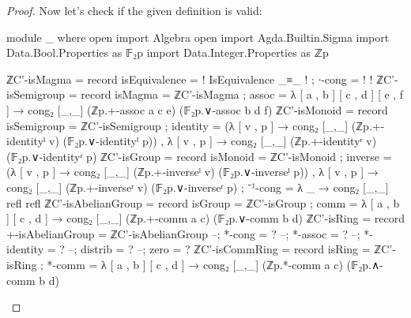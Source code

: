 \documentclass[a4paper]{report}
\theoremstyle{definition}
\begin{document}
\begin{proof}
  Now let's check if the given definition is valid:
  \begin{code}
module _ where
  open import Algebra
  open import Agda.Builtin.Sigma
  import Data.Bool.Properties as 𝔽₂p
  import Data.Integer.Properties as ℤp

  ℤC'-isMagma = record
    { isEquivalence = {! IsEquivalence _≡_ !}
    ; ∙-cong        = {!   !}
    }
  ℤC'-isSemigroup = record
    { isMagma = ℤC'-isMagma
      ; assoc   = λ [ a , b ] [ c , d ] [ e , f ] → cong₂ [_,_] (ℤp.+-assoc a c e) (𝔽₂p.∨-assoc b d f)
    }
  ℤC'-isMonoid = record
    { isSemigroup = ℤC'-isSemigroup
    ; identity    = (λ [ v , p ] → cong₂ [_,_] (ℤp.+-identityˡ v) (𝔽₂p.∨-identityˡ p)) , λ [ v , p ] → cong₂ [_,_] (ℤp.+-identityʳ v) (𝔽₂p.∨-identityʳ p)
    }
  ℤC'-isGroup = record
    { isMonoid = ℤC'-isMonoid
    ; inverse  = (λ [ v , p ] → cong₂ [_,_] (ℤp.+-inverseˡ v) (𝔽₂p.∨-inverseˡ p)) , λ [ v , p ] → cong₂ [_,_] (ℤp.+-inverseʳ v) (𝔽₂p.∨-inverseʳ p)
    ; ⁻¹-cong  = λ _ → cong₂ [_,_] refl refl
    }
  ℤC'-isAbelianGroup = record
    { isGroup = ℤC'-isGroup
    ; comm    = λ [ a , b ] [ c , d ] → cong₂ [_,_] (ℤp.+-comm a c) (𝔽₂p.∨-comm b d)
    }
  ℤC'-isRing = record
    { +-isAbelianGroup = ℤC'-isAbelianGroup
    --; *-cong = ?
    --; *-assoc = ?
    --; *-identity = ?
    --; distrib = ?
    --; zero = ?
    }
  ℤC'-isCommRing = record
    { isRing = ℤC'-isRing
    ; *-comm = λ [ a , b ] [ c , d ] → cong₂ [_,_] (ℤp.*-comm a c) (𝔽₂p.∧-comm b d)
    }

  \end{code}
\end{proof}
\end{document}
